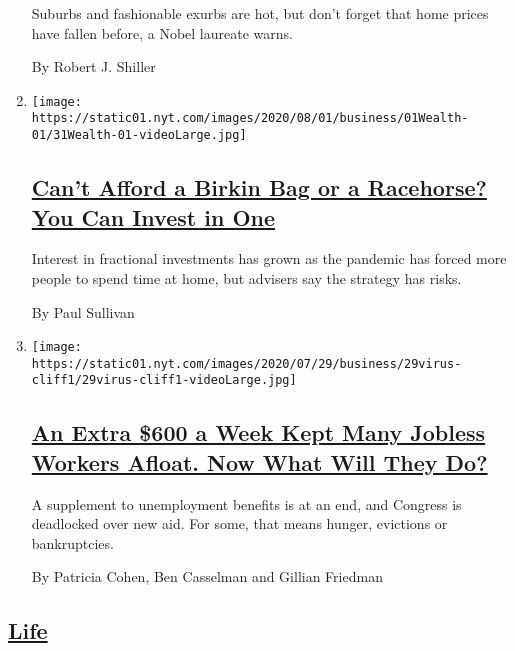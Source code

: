 \begin{enumerate}
  Suburbs and fashionable exurbs are hot, but don't forget that home
  prices have fallen before, a Nobel laureate warns.

  By Robert J. Shiller
\item
  \texttt{[image: https://static01.nyt.com/images/2020/08/01/business/01Wealth-01/31Wealth-01-videoLarge.jpg]}

  \hypertarget{cant-afford-a-birkin-bag-or-a-racehorse-you-can-invest-in-one}{%
  \subsection{\texorpdfstring{\href{/2020/07/31/your-money/birkin-bag-racehorse-invest.html}{Can't
  Afford a Birkin Bag or a Racehorse? You Can Invest in
  One}}{Can't Afford a Birkin Bag or a Racehorse? You Can Invest in One}}\label{cant-afford-a-birkin-bag-or-a-racehorse-you-can-invest-in-one}}

  Interest in fractional investments has grown as the pandemic has
  forced more people to spend time at home, but advisers say the
  strategy has risks.

  By Paul Sullivan
\item
  \texttt{[image: https://static01.nyt.com/images/2020/07/29/business/29virus-cliff1/29virus-cliff1-videoLarge.jpg]}

  \hypertarget{an-extra-600-a-week-kept-many-jobless-workers-afloat-now-what-will-they-do}{%
  \subsection{\texorpdfstring{\href{/2020/07/29/business/economy/unemployment-benefits-coronavirus.html}{An
  Extra \$600 a Week Kept Many Jobless Workers Afloat. Now What Will
  They
  Do?}}{An Extra \$600 a Week Kept Many Jobless Workers Afloat. Now What Will They Do?}}\label{an-extra-600-a-week-kept-many-jobless-workers-afloat-now-what-will-they-do}}

  A supplement to unemployment benefits is at an end, and Congress is
  deadlocked over new aid. For some, that means hunger, evictions or
  bankruptcies.

  By Patricia Cohen, Ben Casselman and Gillian Friedman
\end{enumerate}

\hypertarget{life}{%
\subsection{\texorpdfstring{\protect\hyperlink{}{Life}}{Life}}\label{life}}

